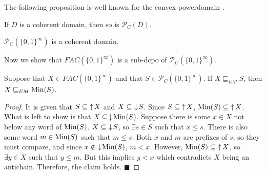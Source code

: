 The following proposition is well known for the convex powerdomain \cite{mislove1998topology}.
\begin{proposition}
If $D$ is a coherent domain, then so is $\mathcal{P}_C(D)$.
\end{proposition}
\begin{corollary}
$\mathcal{P}_C(\{0,1\}^\infty)$ is a coherent domain.
\end{corollary}
Now we show that $FAC(\{0,1\}^\infty)$ is a sub-dcpo of $\mathcal{P}_C(\{0,1\}^\infty)$.
\begin{lemma}
Suppose that $X\in FAC(\{0,1\}^\infty)$ and that $S \in \mathcal{P}_C(\{0,1\}^\infty)$.  If ${X\sqsubseteq_{EM} S}$, then ${X\sqsubseteq_{EM} \textup{\textrm{Min}}(S)}$.
\end{lemma}
\begin{proof}
It is given that $S \subseteq\, \,\uparrow\! X$ and $X\subseteq\, \,\downarrow\! S$.  Since $S \subseteq\, \,\uparrow\! X$, $\textrm{Min}(S) \subseteq\, \,\uparrow\! X$.  What is left to show is that $X\subseteq \,\downarrow\! \textrm{Min}(S)$.  Suppose there is some $x\in X$ not below any word of $\textrm{Min}(S)$.  $X\subseteq\, \,\downarrow\! S$, so $\exists s\in S$ such that $x\leq s$.  There is also some word $m \in \textrm{Min}(S)$ such that $m\leq s$.  Both $x$ and $m$ are prefixes of $s$, so they must compare, and since $x\notin\, \,\downarrow\! \textrm{Min}(S)$, $m<x$.  However, $\textrm{Min}(S) \subseteq\, \,\uparrow\! X$, so $\exists y\in X$ such that $y\leq m$.  But this implies $y<x$ which contradicts $X$ being an antichain.  Therefore, the claim holds. \hfill$\blacksquare$
\end{proof}

